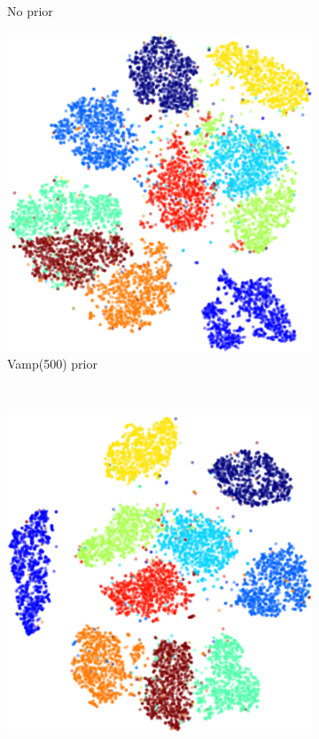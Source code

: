 \begin{figure}[h]
\begin{subfigure}[t]{0.3\textwidth}
    \caption{No prior}
\end{subfigure}
\begin{subfigure}[t]{0.3\textwidth}
    \centering
    \includegraphics[width=\textwidth]{img/loracs/mnist/tsne/mnist2-tsne-vamp.png}
    \caption{Vamp(500) prior}
\end{subfigure}
~
\begin{subfigure}[t]{0.3\textwidth}
    \centering
    \includegraphics[width=\textwidth]{img/loracs/mnist/tsne/mnist2-tsne-maf.png}

\end{subfigure}
\end{figure}
